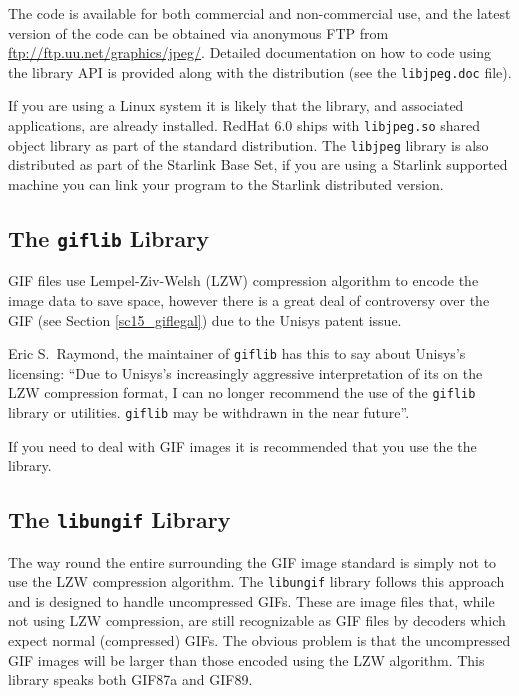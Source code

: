 \documentclass[twoside,11pt]{starlink}
\begin{document}
The code is available for both commercial and non-commercial use, and
the latest version of the code can be obtained via anonymous FTP from
\url{ftp://ftp.uu.net/graphics/jpeg/}.
Detailed documentation on how to code using the library API is
provided along with the distribution (see the \texttt{libjpeg.doc} file).


If you are using a Linux system it is likely that the library, and
associated applications, are already installed. RedHat 6.0 ships with
\texttt{libjpeg.so} shared object library as part of the standard
distribution. The \texttt{libjpeg} library is also distributed as part of
the Starlink Base Set, if you are using a Starlink supported machine
you can link your program to the Starlink distributed version.

\subsection{The \texttt{giflib} Library\label{sc15_libgif}}

GIF files use Lempel-Ziv-Welsh (LZW) compression algorithm to encode
the image data to save space, however there is a great deal of
controversy over the GIF 
(see Section \ref{sc15_giflegal}) due to the Unisys patent
issue.

Eric S.\ Raymond, the maintainer of \texttt{giflib} has this to say about
Unisys's licensing: ``Due to Unisys's increasingly aggressive
interpretation of its  on the
LZW compression format, I can no longer recommend the use of the \texttt{giflib} library or utilities. \texttt{giflib} may be withdrawn in the
near future''.

If you need to deal with GIF images it is recommended that you use the
the  library.

\subsection{The \texttt{libungif} Library\label{sc15_libungif}}

The way round the entire 
surrounding the GIF image standard is simply not to use the LZW
compression algorithm. The \texttt{libungif} library follows this
approach and is designed to handle uncompressed GIFs. These are image
files that, while not using LZW compression, are still recognizable as
GIF files by decoders which expect normal (compressed) GIFs. The
obvious problem is that the uncompressed GIF images will be larger
than those encoded using the LZW algorithm. This library speaks both
GIF87a and GIF89.
\end{document}
